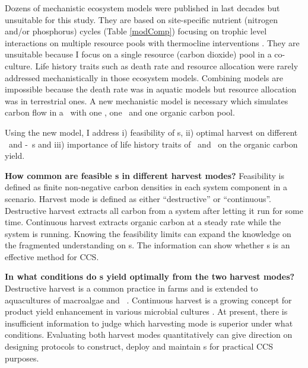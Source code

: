 \documentclass[../thesis.tex]{subfiles} %
\begin{document}
Dozens of mechanistic ecosystem models were published in last decades but unsuitable for this study.  They are based on site-specific nutrient (nitrogen and/or phosphorus) cycles (Table \ref{modComp}) focusing on trophic level interactions on multiple resource pools \autocite{llebot2010role,mitra2009closure,findlay2006modelling} with thermocline interventions \autocite{anderson2015empower,kidston2013phytoplankton,llebot2010role}.  They are unsuitable because I focus on a single resource (carbon dioxide) pool in a co-culture.  Life history traits such as death rate \autocite{anderson2015empower,kidston2013phytoplankton} and resource allocation \autocite{xiao1996relative} were rarely addressed mechanistically in those ecosystem models.  Combining models are impossible because the death rate was in aquatic models but resource allocation was in terrestrial ones.  A new mechanistic model is necessary which simulates carbon flow in a \pbs\ with one \phy, one \bacm\ and one organic carbon pool.

Using the new model, I address \Rn{1}) feasibility of \pbs s, \Rn{2}) optimal harvest on different \phy\ and \phy-\bac\ \pbs s and \Rn{3}) importance of life history traits of \phy\ and \bac\ on the organic carbon yield.

\textbf{How common are feasible \pbs s in different harvest modes?}  Feasibility is defined as finite non-negative carbon densities in each system component in a scenario.  Harvest mode is defined as either ``destructive” or ``continuous”.  Destructive harvest extracts all carbon from a system after letting it run for some time.  Continuous harvest extracts organic carbon at a steady rate while the system is running.  Knowing the feasibility limits can expand the knowledge on the fragmented understanding \autocite{fuentes2016impact} on \pbs s.  The information can show whether \pbs s is an effective method for CCS.

\textbf{In what conditions do \pbs s yield optimally from the two harvest modes?}  Destructive harvest is a common practice in farms and is extended to aquacultures of macroalgae \autocite{duarte2017can} and \phy\  \autocite{evanson_2019}.  Continuous harvest is a growing concept for product yield enhancement in various microbial cultures \autocite{aytekin2016statistical,fuentes2016impact}.  At present, there is insufficient information to judge which harvesting mode is superior under what conditions.  Evaluating both harvest modes quantitatively can give direction on designing protocols to construct, deploy and maintain \pbs s for practical CCS purposes.
\end{document}
